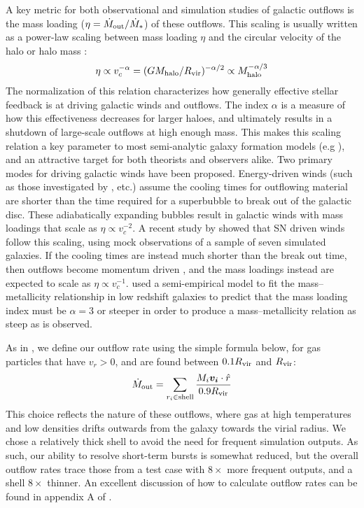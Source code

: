 A key metric for both observational and simulation studies of galactic outflows
is the mass loading ($\eta = \dot M_{\rm out} / \dot M_*$) of these outflows.  This
scaling is usually written as a power-law scaling between mass loading $\eta$
and the circular velocity of the halo or halo mass
\citep{Murray2005,Peeples2011}:
\begin{equation}
    \eta \propto v_c^{-\alpha} = (GM_{\rm halo}/R_{\rm vir})^{-\alpha/2} \propto
    M_{\rm halo}^{-\alpha/3}
\end{equation}
The normalization of this relation characterizes how generally effective stellar
feedback is at driving galactic winds and outflows.  The index $\alpha$ is a
measure of how this effectiveness decreases for larger haloes, and ultimately
results in a shutdown of large-scale outflows at high enough mass.  This makes
this scaling relation a key parameter to most semi-analytic galaxy formation
models (e.g \citet{Cole2000}), and an attractive target for both theorists and
observers alike.  Two primary modes for driving galactic winds have been
proposed.  Energy-driven winds (such as those investigated by
\citet{MacLow1988,Tegmark1993}, etc.) assume the cooling times for outflowing
material are shorter than the time required for a superbubble to break out of
the galactic disc.  These adiabatically expanding bubbles result in galactic
winds with mass loadings that scale as $\eta \propto v_c^{-2}$.  A recent study
by \citet{Christensen2016} showed that SN driven winds follow this scaling,
using mock observations of a sample of seven simulated galaxies.  If the cooling
times are instead much shorter than the break out time, then outflows become
momentum driven \citep{Murray2005}, and the mass loadings instead are expected
to scale as $\eta \propto v_c^{-1}$.  \citet{Peeples2011} used a semi-empirical
model to fit the mass--metallicity relationship in low redshift galaxies to
predict that the mass loading index must be $\alpha=3$ or steeper in order to
produce a mass--metallicity relation as steep as is observed.

As in \citet{Keller2015}, we define our outflow rate using the
simple formula below, for gas particles that have $v_r > 0$, and are found
between $0.1R_{\rm vir}$ and $R_{\rm vir}$:
\begin{equation}
    \dot M_{\rm out} = \sum_{r_i\in\mathrm{shell}}\frac{M_i \boldsymbol{v_i}\cdot\hat
    r}{0.9R_{\rm vir}}
    \label{halo_massflux3}
\end{equation}
This choice reflects the nature of these outflows, where gas at high
temperatures and low densities drifts outwards from the galaxy towards
the virial radius.  We chose a relatively thick shell to avoid the need for
frequent simulation outputs.  As such, our ability to resolve short-term bursts
is somewhat reduced, but the overall outflow rates trace those from a test case
with $8\times$ more frequent outputs, and a shell $8\times$ thinner.  An
excellent discussion of how to calculate outflow rates can be found in appendix
A of \citet{Muratov2015}.

